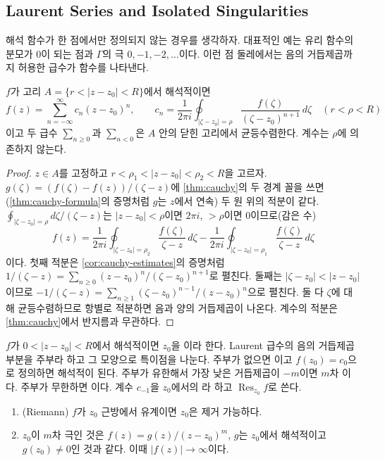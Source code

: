 \subsection{Laurent Series and Isolated Singularities}

해석 함수가 한 점에서만 정의되지 않는 경우를 생각하자. 대표적인 예는 유리 함수의 분모가 $0$이 되는 점과 $\Gamma$의 극 $0,-1,-2,\dots$이다. 이런 점 둘레에서는 음의 거듭제곱까지 허용한 급수가 함수를 나타낸다.

\begin{theorem}[Laurent]
\label{thm:laurent}
$f$가 고리 $A=\{r<|z-z_0|<R\}$에서 해석적이면
\[
f(z)=\sum_{n=-\infty}^{\infty}c_n(z-z_0)^n,\qquad c_n=\frac{1}{2\pi i}\oint_{|\zeta-z_0|=\rho}\frac{f(\zeta)}{(\zeta-z_0)^{n+1}}\,d\zeta\quad(r<\rho<R)
\]
이고 두 급수 $\sum_{n\ge0}$과 $\sum_{n<0}$은 $A$ 안의 닫힌 고리에서 균등수렴한다. 계수는 $\rho$에 의존하지 않는다.
\end{theorem}

\begin{proof}
$z\in A$를 고정하고 $r<\rho_1<|z-z_0|<\rho_2<R$을 고르자. $g(\zeta)=(f(\zeta)-f(z))/(\zeta-z)$에 \cref{thm:cauchy}의 두 경계 꼴을 쓰면(\cref{thm:cauchy-formula}의 증명처럼 $g$는 $z$에서 연속) 두 원 위의 적분이 같다. $\oint_{|\zeta-z_0|=\rho}d\zeta/(\zeta-z)$는 $|z-z_0|<\rho$이면 $2\pi i$, $>\rho$이면 $0$이므로(감은 수)
\[
f(z)=\frac{1}{2\pi i}\oint_{|\zeta-z_0|=\rho_2}\frac{f(\zeta)}{\zeta-z}\,d\zeta-\frac{1}{2\pi i}\oint_{|\zeta-z_0|=\rho_1}\frac{f(\zeta)}{\zeta-z}\,d\zeta
\]
이다. 첫째 적분은 \cref{cor:cauchy-estimates}의 증명처럼 $1/(\zeta-z)=\sum_{n\ge0}(z-z_0)^n/(\zeta-z_0)^{n+1}$로 펼친다. 둘째는 $|\zeta-z_0|<|z-z_0|$이므로 $-1/(\zeta-z)=\sum_{n\ge1}(\zeta-z_0)^{n-1}/(z-z_0)^n$으로 펼친다. 둘 다 $\zeta$에 대해 균등수렴하므로 항별로 적분하면 음과 양의 거듭제곱이 나온다. 계수의 적분은 \cref{thm:cauchy}에서 반지름과 무관하다.
\end{proof}

$f$가 $0<|z-z_0|<R$에서 해석적이면 $z_0$을 이라 한다. Laurent 급수의 음의 거듭제곱 부분을 주부라 하고 그 모양으로 특이점을 나눈다. 주부가 없으면 이고 $f(z_0)=c_0$으로 정의하면 해석적이 된다. 주부가 유한해서 가장 낮은 거듭제곱이 $-m$이면 $m$차 이다. 주부가 무한하면 이다. 계수 $c_{-1}$을 $z_0$에서의 라 하고 $\operatorname{Res}_{z_0}f$로 쓴다.

\begin{proposition}
\label{prop:singularities}
\begin{enumerate}
\item (Riemann) $f$가 $z_0$ 근방에서 유계이면 $z_0$은 제거 가능하다.
\item $z_0$이 $m$차 극인 것은 $f(z)=g(z)/(z-z_0)^m$, $g$는 $z_0$에서 해석적이고 $g(z_0)\ne0$인 것과 같다. 이때 $|f(z)|\to\infty$이다.
\end{enumerate}
\end{proposition}

